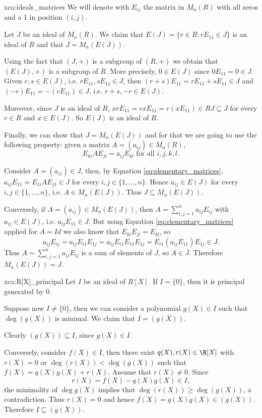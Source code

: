  \begin{sol}{xca:ideals_matrices}
 We will denote with $E_{ij}$ the matrix in $M_n(R)$
 with all zeros and a 1 in position $(i,j)$.
 
Let $J$ be an ideal of $M_n(R)$. We claim that 
$E(J)=\{r\in R:rE_{11}\in J\}$ is an ideal of $R$ and that $J=M_n(E(J))$.

Using the fact that $(J,+)$ is a subgroup of $(R,+)$ we obtain that
$(E(J),+)$ is a subgroup of $R$.
More precisely, $0\in E(J)$ since $0E_{11}=0\in J$. Given $r,s\in E(J)$, i.e.
$rE_{11},sE_{11}\in J$, then $(r+s)E_{11}=rE_{11}+sE_{11}\in J$ and $(-r)E_{11}=-(rE_{11})\in J$, i.e. $r+s,-r\in E(J)$.

Moreover, since $J$ is an ideal of $R$,
$xrE_{11}=rxE_{11}=r(xE_{11})\in RJ\subseteq J$
for every $r\in R$ and $x\in E(J)$. 
So $E(J)$ is an ideal of $R$.

Finally, we can show that $J=M_n(E(J))$ and for that we are going to use the following property: given a matrix $A=(a_{ij})\in M_n(R)$,
\begin{equation}
\label{eq:elementary_matrices}
    E_{ki}AE_{jl}=a_{ij}E_{kl}\text{ for all }i,j,k,l.
\end{equation}


Consider $A=(a_{ij})\in J$,
then, by Equation \ref{eq:elementary_matrices},
$a_{ij}E_{11}=E_{1i}AE_{j1}\in J$ for every $i,j\in\{1,\dots, n\}$.
Hence $a_{ij}\in E(J)$ for every $i,j\in\{1,\dots, n\}$, i.e. $A\in M_n(E(J))$.
Thus $J\subseteq M_n(E(J))$.

Conversely, if $A=(a_{ij})\in M_n(E(J))$,
then $A=\sum_{i,j=1}^n a_{ij}E_{ij}$ with $a_{ij}\in E(J)$,
i.e. $a_{ij}E_{11}\in J$.
But using Equation \ref{eq:elementary_matrices} applied for $A=Id$
we also know that $E_{ki}E_{jl}=E_{kl}$, so
\[
a_{ij}E_{ij}=a_{ij}E_{i1}E_{1j}=a_{ij}E_{i1}E_{11}E_{1j}=E_{i1}(a_{ij}E_{11})E_{1j}\in J.
\]
Thus $A=\sum_{i,j=1}^n a_{ij}E_{ij}$ is a sum of elements of $J$, so $A\in J$.
Therefore $M_n(E(J))= J$.
 \end{sol}

\begin{sol}{xca:R[X]_principal}
Let $I$ be an ideal of $R[X]$. If $I=\{0\}$, then it is principal generated by $0$.

Suppose now $I\neq \{0\}$, then we can consider a polynomial $g(X)\in I$ 
such that $\deg(g(X))$ is minimal. We claim that $I=(g(X))$.

Clearly $(g(X))\subseteq I$, since $g(X)\in I$.

Conversely, consider $f(X)\in I$, then there exist 
$q(X),r(X)\in \R[X]$ with $r(X)=0$ or $\deg(r(X))<\deg(g(X))$
such that $f(X)=q(X)g(X)+r(X)$. 
Assume that $r(X)\neq 0$. Since 
\[
r(X)=f(X)-q(X)g(X)\in I,
\]
the minimality of $\deg g(X)$ implies that  $\deg(r(X))\geq\deg(g(X))$, a contradiction.
Thus $r(X)=0$ and hence $f(X)=q(X)g(X)\in (g(X))$. Therefore $I\subseteq (g(X))$.
\end{sol}
 
